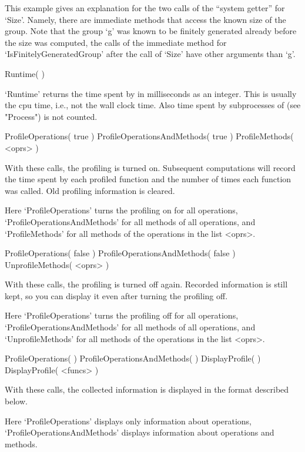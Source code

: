 This example gives an explanation for the two calls of the
``system getter'' for `Size'.
Namely, there are immediate methods that access the known size
of the group.
Note that the group `g' was known to be finitely generated already
before the size was computed,
the calls of the immediate method for `IsFinitelyGeneratedGroup'
after the call of `Size' have other arguments than `g'.



\>Runtime(  )

`Runtime' returns the time spent by {\GAP} in milliseconds as an integer.
This is usually the cpu time, i.e., not the wall clock time.
Also time spent by subprocesses of {\GAP} (see "Process") is not counted.



\>ProfileOperations( true )
\)ProfileOperationsAndMethods( true )
\)ProfileMethods( <oprs> )

With these calls, the profiling is turned on.
Subsequent computations will record the time spent by each profiled
function and the number of times each function was called.
Old profiling information is cleared.

Here `ProfileOperations' turns the profiling on for all operations,
`ProfileOperationsAndMethods' for all methods of all operations,
and `ProfileMethods' for all methods of the operations in the list
<oprs>.


\>ProfileOperations( false )
\)ProfileOperationsAndMethods( false )
\)UnprofileMethods( <oprs> )

With these calls, the profiling is turned off again.
Recorded information is still kept, so you can  display it even after
turning the profiling off.

Here `ProfileOperations' turns the profiling off for all operations,
`ProfileOperationsAndMethods' for all methods of all operations,
and `UnprofileMethods' for all methods of the operations in the list
<oprs>.


\>ProfileOperations(  )
\)ProfileOperationsAndMethods(  )
\)DisplayProfile(  )
\)DisplayProfile( <funcs> )

With these calls, the collected information is displayed in the format
described below.

Here `ProfileOperations' displays only information about operations,
`ProfileOperationsAndMethods' displays information about operations
and methods.

